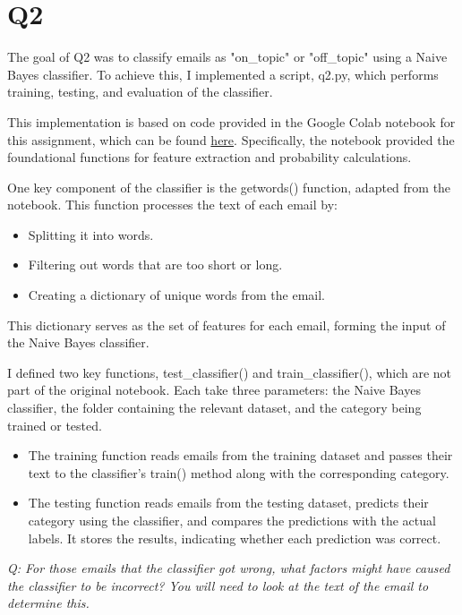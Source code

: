 \documentclass[12pt]{article}
\begin{document}

\section*{Q2}

The goal of Q2 was to classify emails as "on\_topic" or "off\_topic" using a Naive Bayes classifier. To achieve this, I implemented a script, q2.py, which performs training, testing, and evaluation of the classifier.

This implementation is based on code provided in the Google Colab notebook for this assignment, which can be found \href{https://github.com/odu-cs432-websci/public/blob/main/432_PCI_Ch06.ipynb}{here}. Specifically, the notebook provided the foundational functions for feature extraction and probability calculations.

One key component of the classifier is the getwords() function, adapted from the notebook. This function processes the text of each email by:
\begin{itemize}
    \item Splitting it into words.
    \item Filtering out words that are too short or long.
    \item Creating a dictionary of unique words from the email.
\end{itemize}

This dictionary serves as the set of features for each email, forming the input of the Naive Bayes classifier.

I defined two key functions, test\_classifier() and train\_classifier(), which are not part of the original notebook. Each take three parameters: the Naive Bayes classifier, the folder containing the relevant dataset, and the category being trained or tested.
\begin{itemize}
    \item The training function reads emails from the training dataset and passes their text to the classifier's train() method along with the corresponding category.
    \item The testing function reads emails from the testing dataset, predicts their category using the classifier, and compares the predictions with the actual labels. It stores the results, indicating whether each prediction was correct.
\end{itemize} 

\emph{Q: For those emails that the classifier got wrong, what factors might have caused the classifier to be incorrect? You will need to look at the text of the email to determine this.}
\end{document}
